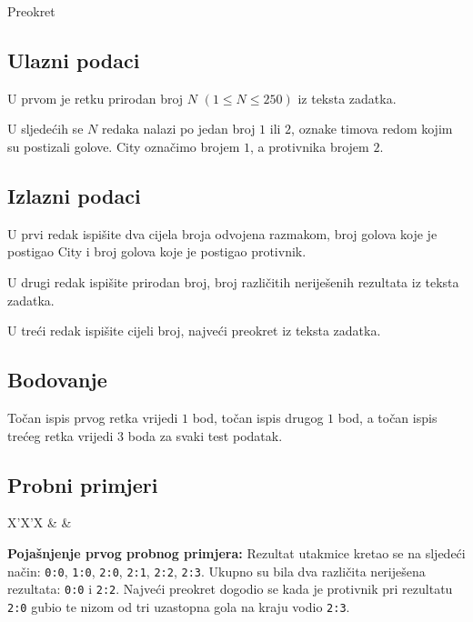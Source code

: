 \begin{statement}[
  problempoints=50,
  timelimit=1 sekunda,
  memorylimit=512 MiB,
]{Preokret}
\subsection*{Ulazni podaci}
U prvom je retku prirodan broj $N$ $(1 \le N \le 250)$ iz teksta zadatka.

U sljedećih se $N$ redaka nalazi po jedan broj $1$ ili $2$, oznake timova redom
kojim su postizali golove. City označimo brojem $1$, a protivnika brojem $2$.

\subsection*{Izlazni podaci}
U prvi redak ispišite dva cijela broja odvojena razmakom, broj golova koje je
postigao City i broj golova koje je postigao protivnik.

U drugi redak ispišite prirodan broj, broj različitih neriješenih rezultata iz
teksta zadatka.

U treći redak ispišite cijeli broj, najveći preokret iz teksta zadatka.

\subsection*{Bodovanje}
Točan ispis prvog retka vrijedi $1$ bod, točan ispis drugog $1$ bod, a točan
ispis trećeg retka vrijedi $3$ boda za svaki test podatak.

\subsection*{Probni primjeri}
\begin{tabularx}{\textwidth}{X'X'X}
 &
 &
\end{tabularx}

\textbf{Pojašnjenje prvog probnog primjera:}
Rezultat utakmice kretao se na sljedeći način: \texttt{0:0}, \texttt{1:0},
\texttt{2:0}, \texttt{2:1}, \texttt{2:2}, \texttt{2:3}.  Ukupno su bila dva
različita neriješena rezultata: \texttt{0:0} i \texttt{2:2}. Najveći preokret
dogodio se kada je protivnik pri rezultatu \texttt{2:0} gubio te nizom od tri
uzastopna gola na kraju vodio \texttt{2:3}.


\end{statement}
